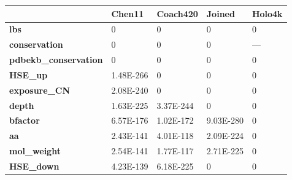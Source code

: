 \begin{table}[]
\begin{tabular}{lllll}
\hline
\textbf{}                     & \textbf{Chen11}                & \textbf{Coach420}               & \textbf{Joined}                & \textbf{Holo4k}                 \\ \hline
\textbf{lbs}                  & 0                              & 0                               & 0                              & 0                               \\
\textbf{conservation}         & 0                              & 0                               & 0                              & ---                             \\
\textbf{pdbekb\_conservation} & 0                              & 0                               & 0                              & 0                               \\
\textbf{HSE\_up}              & 1.48E-266                      & 0                               & 0                              & 0                               \\
\textbf{exposure\_CN}         & 2.08E-240                      & 0                               & 0                              & 0                               \\
\textbf{depth}                & 1.63E-225                      & 3.37E-244                       & 0                              & 0                               \\
\textbf{bfactor}              & 6.57E-176                      & 1.02E-172                       & 9.03E-280                      & 0                               \\
\textbf{aa}                   & 2.43E-141                      & 4.01E-118                       & 2.09E-224                      & 0                               \\
\textbf{mol\_weight}          & 2.54E-141                      & 1.77E-117                       & 2.71E-225                      & 0                               \\
\textbf{HSE\_down}            & 4.23E-139                      & 6.18E-225                       & 0                              & 0                               \\

\end{tabular}
\end{table}
